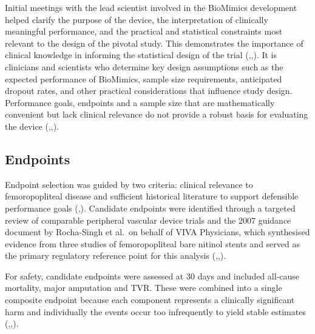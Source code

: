 \documentclass{article}
\begin{document}
Initial meetings with the lead scientist involved in the BioMimics
development helped clarify the purpose of the device, the interpretation
of clinically meaningful performance, and the practical and statistical
constraints most relevant to the design of the pivotal study. This
demonstrates the importance of clinical knowledge in informing the
statistical design of the trial
(,,).
It is clinicians and scientists who determine key design assumptions
such as the expected performance of BioMimics, sample size requirements,
anticipated dropout rates, and other practical considerations that
influence study design. Performance goals, endpoints and a sample size
that are mathematically convenient but lack clinical relevance do not
provide a robust basis for evaluating the device
(,,).

\subsection{Endpoints}\label{endpoints}

Endpoint selection was guided by two criteria: clinical relevance to
femoropopliteal disease and sufficient historical literature to support
defensible performance goals
(,).
Candidate endpoints were identified through a targeted review of
comparable peripheral vascular device trials and the 2007 guidance
document by Rocha-Singh et al.~on behalf of VIVA Physicians, which
synthesised evidence from three studies of femoropopliteal bare nitinol
stents and served as the primary regulatory reference point for this
analysis
(,,).

For safety, candidate endpoints were assessed at 30 days and included
all-cause mortality, major amputation and TVR. These were combined into
a single composite endpoint because each component represents a
clinically significant harm and individually the events occur too
infrequently to yield stable estimates
(,,).
\end{document}
